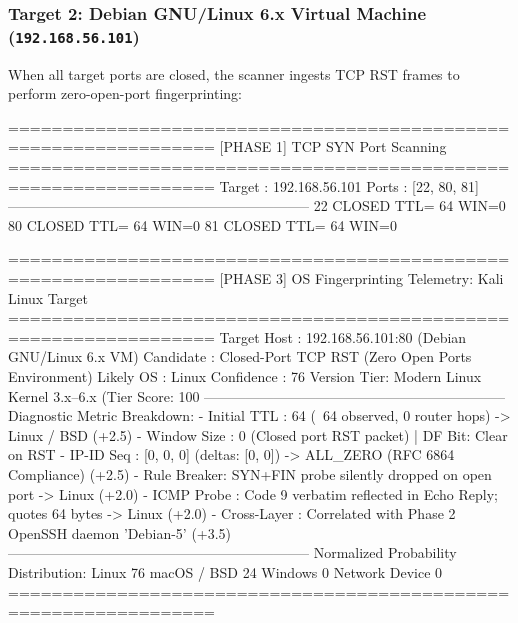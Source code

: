 \subsubsection{Target 2: Debian GNU/Linux 6.x Virtual Machine (\texttt{192.168.56.101})}
When all target ports are closed, the scanner ingests TCP RST frames to perform zero-open-port fingerprinting:

\begin{logbox}
=================================================================
  [PHASE 1] TCP SYN Port Scanning
=================================================================
  Target      : 192.168.56.101
  Ports       : [22, 80, 81]
-----------------------------------------------------------------
     22  CLOSED                         TTL= 64 WIN=0
     80  CLOSED                         TTL= 64 WIN=0
     81  CLOSED                         TTL= 64 WIN=0

=================================================================
  [PHASE 3] OS Fingerprinting Telemetry: Kali Linux Target
=================================================================
  Target Host : 192.168.56.101:80 (Debian GNU/Linux 6.x VM)
  Candidate   : Closed-Port TCP RST (Zero Open Ports Environment)
  Likely OS   : Linux                   Confidence : 76%
  Version Tier: Modern Linux Kernel 3.x--6.x (Tier Score: 100%
-----------------------------------------------------------------
  Diagnostic Metric Breakdown:
    - Initial TTL : 64 (~64 observed, 0 router hops) -> Linux / BSD (+2.5)
    - Window Size : 0 (Closed port RST packet) | DF Bit: Clear on RST
    - IP-ID Seq   : [0, 0, 0] (deltas: [0, 0]) -> ALL_ZERO (RFC 6864 Compliance) (+2.5)
    - Rule Breaker: SYN+FIN probe silently dropped on open port -> Linux (+2.0)
    - ICMP Probe  : Code 9 verbatim reflected in Echo Reply; quotes 64 bytes -> Linux (+2.0)
    - Cross-Layer : Correlated with Phase 2 OpenSSH daemon 'Debian-5' (+3.5)
-----------------------------------------------------------------
  Normalized Probability Distribution:
    Linux             76%
    macOS / BSD       24%
    Windows            0%
    Network Device     0%
=================================================================
\end{logbox}

